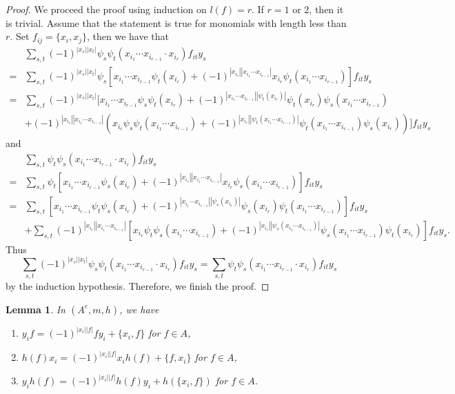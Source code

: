 \documentclass[a4paper,10pt]{amsart}
\newtheorem{lemma}[theorem]{Lemma}
\theoremstyle{definition}
\theoremstyle{remark}
\numberwithin{equation}{section}
\begin{document}
\begin{proof}
We proceed the proof using induction on $l(f)=r$. If $r=1$ or $2$, then
it is trivial. Assume that the statement is true for monomials with
length less than $r$. Set $f_{ij}=\{x_i, x_j\}$, then we have that
\begin{align*}
&\sum_{s,
t}(-1)^{|x_s||x_t|}\psi_{s}\psi_{t}(x_{i_1}\cdots x_{i_{r-1}}\cdot x_{i_r})f_{it}y_s\\
=&\sum_{s,
t}(-1)^{|x_s||x_t|}\psi_{s}[x_{i_1}\cdots x_{i_{r-1}}\psi_{t}(x_{i_r})+(-1)^{|x_{i_r}||x_{i_1}\cdots x_{i_{r-1}}|}x_{i_r}\psi_{t}(x_{i_1}\cdots x_{i_{r-1}})]f_{it}y_s\\
=&\sum_{s, t}(-1)^{|x_s||x_t|}[x_{i_1}\cdots x_{i_{r-1}}\psi_{s}\psi_{t}(x_{i_r})+(-1)^{|x_{i_1}\cdots x_{i_{r-1}}||\psi_t(x_{i_r})|}\psi_{t}(x_{i_r})
\psi_{s}(x_{i_1}\cdots x_{i_{r-1}})\\&+(-1)^{|x_{i_r}||x_{i_1}\cdots x_{i_{r-1}}|}(x_{i_r}\psi_{s}\psi_{t}(x_{i_1}\cdots x_{i_{r-1}})+(-1)^{|x_{i_r}||\psi_{t}(x_{i_1}\cdots x_{i_{r-1}})|}
\psi_{t}(x_{i_1}\cdots x_{i_{r-1}})\psi_{s}(x_{i_r}))]f_{it}y_s
\end{align*}
and
\begin{align*}
&\sum_{s,
t}\psi_{t}\psi_{s}(x_{i_1}\cdots x_{i_{r-1}}\cdot x_{i_r})f_{it}y_s\\
=&\sum_{s,
t}\psi_{t}[x_{i_1}\cdots x_{i_{r-1}}\psi_{s}(x_{i_r})+(-1)^{|x_{i_r}||x_{i_1}\cdots x_{i_{r-1}}|}x_{i_r}\psi_{s}(x_{i_1}\cdots x_{i_{r-1}})]f_{it}y_s\\
=&\sum_{s,
t}[x_{i_1}\cdots x_{i_{r-1}}\psi_{t}\psi_{s}(x_{i_r})+(-1)^{|x_{i_1}\cdots x_{i_{r-1}}||\psi_s(x_{i_r})|}\psi_{s}(x_{i_r})
\psi_{t}(x_{i_1}\cdots x_{i_{r-1}})]f_{it}y_s\\&+\sum_{s,
t}(-1)^{|x_{i_r}||x_{i_1}\cdots x_{i_{r-1}}|}[x_{i_r}\psi_{t}\psi_{s}(x_{i_1}\cdots x_{i_{r-1}})+(-1)^{|x_{i_r}||\psi_{s}(x_{i_1}\cdots x_{i_{r-1}})|}
\psi_{s}(x_{i_1}\cdots x_{i_{r-1}})\psi_{t}(x_{i_r})]f_{it}y_s.
\end{align*}
Thus
\[\sum_{s,
t}(-1)^{|x_s||x_t|}\psi_{s}\psi_{t}(x_{i_1}\cdots x_{i_{r-1}}\cdot x_{i_r})f_{it}y_s=\sum_{s,
t}\psi_{t}\psi_{s}(x_{i_1}\cdots x_{i_{r-1}}\cdot x_{i_r})f_{it}y_s\]
by the induction hypothesis. Therefore, we finish the proof.
\end{proof}

\begin{lemma}\label{lem7}
In $(A^e, m, h)$, we have
\begin{enumerate}
  \item[(a)] $y_if=(-1)^{|x_i||f|}fy_i+\{x_i, f\}$ for $f\in A$,
  \item[(b)] $h(f)x_i=(-1)^{|x_i||f|}x_ih(f)+\{f, x_i\}$ for $f\in A$,
  \item[(c)] $y_ih(f)=(-1)^{|x_i||f|}h(f)y_i+h(\{x_i, f\})$ for $f\in A$.
\end{enumerate}
\end{lemma}
\end{document}
